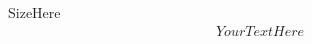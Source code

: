 \documentclass[12pt]{beamer}
\begin{document}
\begin{frame}
	\centering
	SizeHere
	\begin{align*}
		YourTextHere
	\end{align*}
\end{frame}
\end{document}

